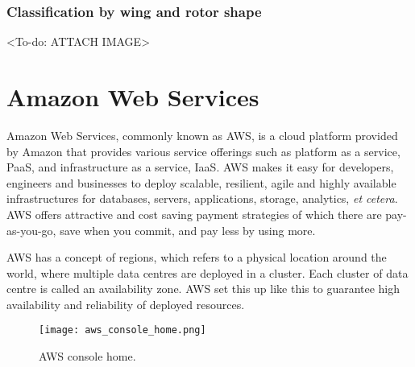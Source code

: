 


\subsubsection*{Classification by wing and rotor shape}

<To-do: ATTACH IMAGE>






\section{Amazon Web Services}
\label{sec:aws}

Amazon Web Services, commonly known as AWS, is a cloud platform provided by Amazon that provides various service offerings such as platform as a service, PaaS, and infrastructure as a service, IaaS\cite{awswhatisaws2022}. AWS makes it easy for developers, engineers and businesses to deploy scalable, resilient, agile and highly available infrastructures for databases, servers, applications, storage, analytics, \textit{et cetera}. AWS offers attractive and cost saving payment strategies of which there are pay-as-you-go, save when you commit, and pay less by using more\cite{awspricing2022}.

AWS has a concept of regions, which refers to a physical location around the world, where multiple data centres are deployed in a cluster. Each cluster of data centre is called an availability zone\cite{awsregionsandazs}. AWS set this up like this to guarantee high availability and reliability of deployed resources.

\begin{figure}[H]
    \centering \texttt{[image: aws\_console\_home.png]}
    \caption{AWS console home.}
    \label{fig:aws-console-home}
\end{figure}

